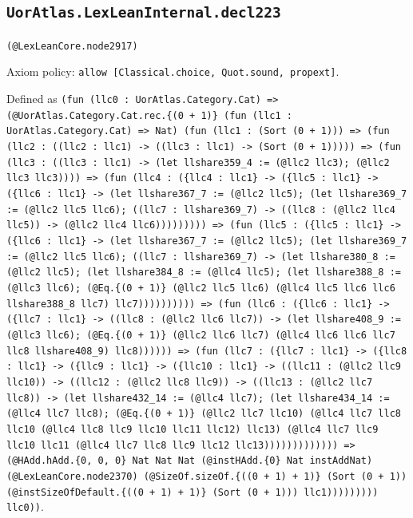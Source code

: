 \documentclass[11pt]{article}
\begin{document}
\subsection*{\texttt{UorAtlas.LexLeanInternal.decl223}}
\noindent\texttt{(@LexLeanCore.node2917)}\par
\noindent Axiom policy: \texttt{allow [Classical.choice, Quot.sound, propext]}.\par
\noindent Defined as \texttt{(fun (llc0 : UorAtlas.Category.Cat) => (@UorAtlas.Category.Cat.rec.\{(0 + 1)\} (fun (llc1 : UorAtlas.Category.Cat) => Nat) (fun (llc1 : (Sort (0 + 1))) => (fun (llc2 : ((llc2 : llc1) -> ((llc3 : llc1) -> (Sort (0 + 1))))) => (fun (llc3 : ((llc3 : llc1) -> (let llshare359\_4 := (@llc2 llc3); (@llc2 llc3 llc3)))) => (fun (llc4 : (\{llc4 : llc1\} -> (\{llc5 : llc1\} -> (\{llc6 : llc1\} -> (let llshare367\_7 := (@llc2 llc5); (let llshare369\_7 := (@llc2 llc5 llc6); ((llc7 : llshare369\_7) -> ((llc8 : (@llc2 llc4 llc5)) -> (@llc2 llc4 llc6))))))))) => (fun (llc5 : (\{llc5 : llc1\} -> (\{llc6 : llc1\} -> (let llshare367\_7 := (@llc2 llc5); (let llshare369\_7 := (@llc2 llc5 llc6); ((llc7 : llshare369\_7) -> (let llshare380\_8 := (@llc2 llc5); (let llshare384\_8 := (@llc4 llc5); (let llshare388\_8 := (@llc3 llc6); (@Eq.\{(0 + 1)\} (@llc2 llc5 llc6) (@llc4 llc5 llc6 llc6 llshare388\_8 llc7) llc7)))))))))) => (fun (llc6 : (\{llc6 : llc1\} -> (\{llc7 : llc1\} -> ((llc8 : (@llc2 llc6 llc7)) -> (let llshare408\_9 := (@llc3 llc6); (@Eq.\{(0 + 1)\} (@llc2 llc6 llc7) (@llc4 llc6 llc6 llc7 llc8 llshare408\_9) llc8)))))) => (fun (llc7 : (\{llc7 : llc1\} -> (\{llc8 : llc1\} -> (\{llc9 : llc1\} -> (\{llc10 : llc1\} -> ((llc11 : (@llc2 llc9 llc10)) -> ((llc12 : (@llc2 llc8 llc9)) -> ((llc13 : (@llc2 llc7 llc8)) -> (let llshare432\_14 := (@llc4 llc7); (let llshare434\_14 := (@llc4 llc7 llc8); (@Eq.\{(0 + 1)\} (@llc2 llc7 llc10) (@llc4 llc7 llc8 llc10 (@llc4 llc8 llc9 llc10 llc11 llc12) llc13) (@llc4 llc7 llc9 llc10 llc11 (@llc4 llc7 llc8 llc9 llc12 llc13))))))))))))) => (@HAdd.hAdd.\{0, 0, 0\} Nat Nat Nat (@instHAdd.\{0\} Nat instAddNat) (@LexLeanCore.node2370) (@SizeOf.sizeOf.\{((0 + 1) + 1)\} (Sort (0 + 1)) (@instSizeOfDefault.\{((0 + 1) + 1)\} (Sort (0 + 1))) llc1))))))))) llc0))}.\par
\end{document}

